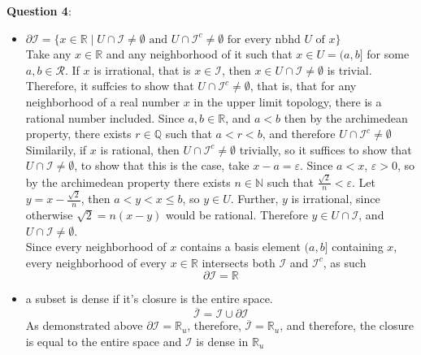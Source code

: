 \documentclass{article} %
\newcommand{\question}[2][]{
  \begin{flushleft}
    \textbf{Question #1}: \textit{#2}

\end{flushleft}}
\begin{document}
\question[4]{}
\begin{itemize}
  \item $\partial \mathcal{I} = \{x \in \mathbb{R} \mid U \cap
      \mathcal{I} \neq \emptyset \text{ and } U \cap \mathcal{I}^c \neq
    \emptyset \text{ for every nbhd } U \text{ of } x\}$\\
    Take any $x \in \mathbb{R}$ and any neighborhood of it such that
    $x \in U = (a, b]$ for some $a, b\in \mathcal{R}$. If $x$ is
    irrational, that is $x \in \mathcal{I}$, then $x \in U \cap
    \mathcal{I} \neq \emptyset$ is trivial. Therefore, it suffcies to
    show that $U \cap \mathcal{I}^c \neq \emptyset$, that is, that
    for any neighborhood of a real number $x$ in the upper limit
    topology, there is a rational number included. Since $a,b \in
    \mathbb{R}$, and $a < b$ then by the archimedean property, there
    exists $r \in \mathbb{Q}$ such that $a < r < b$, and therefore $U
    \cap \mathcal{I}^c \neq \emptyset$ \\

    Similarily, if $x$ is rational, then $U \cap \mathcal{I}^c \neq
    \emptyset$ trivially, so it suffices to show that $U \cap
    \mathcal{I} \neq \emptyset$, to show that this is the case, take
    $x - a = \varepsilon$. Since $a < x$, $\varepsilon > 0$, so by the
    archimedean property there exists $n \in \mathbb{N}$ such that
    $\frac{\sqrt{2}}{n} < \varepsilon$. Let $y = x -
    \frac{\sqrt{2}}{n}$, then $a < y < x \le b$, so $y \in U$. Further,
    $y$ is irrational, since otherwise $\sqrt{2} = n(x - y)$ would be
    rational. Therefore $y \in U \cap \mathcal{I}$, and $U \cap
    \mathcal{I} \neq \emptyset$. \\

    Since every neighborhood of $x$ contains a basis element $(a, b]$
    containing $x$, every neighborhood of every $x \in \mathbb{R}$
    intersects both $\mathcal{I}$ and $\mathcal{I}^c$, as such
    \[
      \partial \mathcal{I} = \mathbb{R}
    \]
  \item a subset is dense if it's closure is the entire space.
    \[
      \overline{\mathcal{I}} = \mathcal{I} \cup \partial \mathcal{I}
    \]
    As demonstrated above $\partial\mathcal{I} = \mathbb{R}_u$,
    therefore, $\overline{\mathcal{I}} = \mathbb{R}_u$, and
    therefore, the closure is equal to the entire space and
    $\mathcal{I}$ is dense in $\mathbb{R}_u$
\end{itemize}
\end{document}
